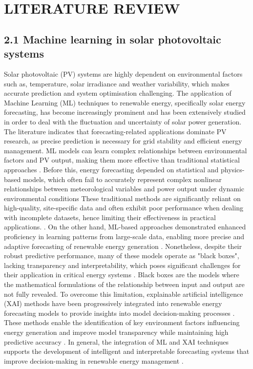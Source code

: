 \chapter{LITERATURE REVIEW}


\section{2.1 Machine learning in solar photovoltaic systems}
Solar photovoltaic (PV) systems are highly dependent on environmental factors such as, temperature, solar irradiance and weather variability, which makes accurate prediction and system optimisation challenging. The application of Machine Learning (ML) techniques to renewable energy, specifically solar energy forecasting, has become increasingly prominent and has been extensively studied in order to deal with the fluctuation and uncertainty of solar power generation. The literature indicates that forecasting-related applications dominate PV research, as precise prediction is necessary for grid stability and efficient energy management. ML models can learn complex relationships between environmental factors and PV output, making them more effective than traditional statistical approaches \parencite{Massidda et al._2025}. Before this, energy forecasting depended on statistical and physics-based models, which often fail to accurately represent complex nonlinear relationships between meteorological variables and power output under dynamic environmental conditions \parencite{Siddiqui et al._2020} These traditional methods are significantly reliant on high-quality, site-specific data and often exhibit poor performance when dealing with incomplete datasets, hence limiting their effectiveness in practical applications. \parencite{Yousef et al._2020}. On the other hand, ML-based approaches demonstrated enhanced proficiency in learning patterns from large-scale data, enabling more precise and adaptive forecasting of renewable energy generation \parencite{Fernando et al._}. Nonetheless, despite their robust predictive performance, many of these models operate as "black boxes", lacking transparency and interpretability, which poses significant challenges for their application in critical energy systems \parencite{Yousef et al._2020}. Black boxes are the models where the mathematical formulations of the relationship between input and output are not fully revealed. To overcome this limitation, explainable artificial intelligence (XAI) methods have been progressively integrated into renewable energy forecasting models to provide insights into model decision-making processes \parencite{Fernando et al._2020}. These methods enable the identification of key environment factors influencing energy generation and improve model transparency while maintaining high predictive accuracy \parencite{Yousef et al._2020}. In general, the integration of ML and XAI techniques supports the development of intelligent and interpretable forecasting systems that improve decision-making in renewable energy management \parencite{Fernando et al_2020; Siddiqui et al._2020}. 

